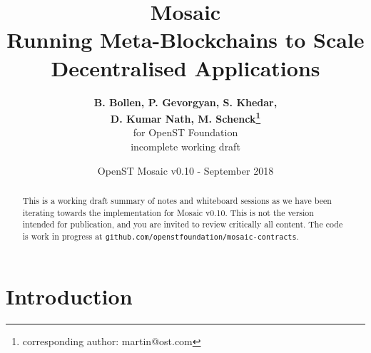 \documentclass[12pt,a4paper]{article}
\title{Mosaic\\\sc\Large{Running Meta-Blockchains to Scale Decentralised Applications}}
\author{\textbf{B. Bollen, P. Gevorgyan, S. Khedar,}\\ \textbf{D. Kumar Nath, M. Schenck\footnote{corresponding author: martin@ost.com}}\\ for OpenST Foundation \\ incomplete working draft}
\date{OpenST Mosaic v0.10 - September 2018}
\begin{document}
\maketitle

\begin{abstract}
This is a working draft summary of notes and whiteboard sessions as we have been iterating towards the implementation for Mosaic v0.10.
This is not the version intended for publication, and you are invited to review critically all content.
The code is work in progress at \verb|github.com/openstfoundation/mosaic-contracts|.
\end{abstract}

%
%
\section{Introduction}

%
%
%
% 
% 
% 
%
\end{document}
